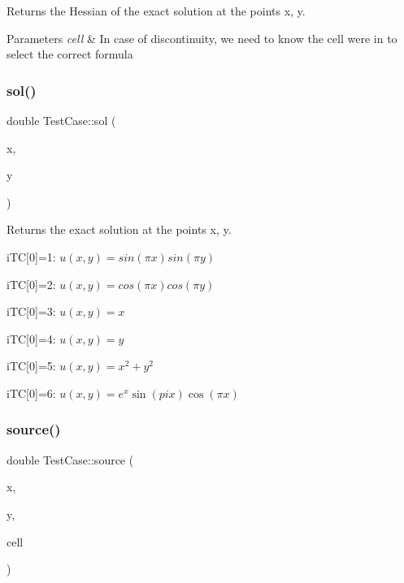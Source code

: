 Returns the Hessian of the exact solution at the points x, y. 


\begin{DoxyParams}{Parameters}
{\em cell} & In case of discontinuity, we need to know the cell we\textquotesingle{}re in to select the correct formula \\
\hline
\end{DoxyParams}
\mbox{\label{classTestCase_aede719dac81c460c713d930a379c537e}} 
\subsubsection{\texorpdfstring{sol()}{sol()}}
{\footnotesize\ttfamily double Test\+Case\+::sol (\begin{DoxyParamCaption}\item[{const double}]{x,  }\item[{const double}]{y }\end{DoxyParamCaption})}



Returns the exact solution at the points x, y. 

i\+TC\mbox{[}0\mbox{]}=1\+: $u(x,y)=sin(\pi x) sin(\pi y)$

i\+TC\mbox{[}0\mbox{]}=2\+: $u(x,y)=cos(\pi x) cos(\pi y)$

i\+TC\mbox{[}0\mbox{]}=3\+: $u(x,y)= x$

i\+TC\mbox{[}0\mbox{]}=4\+: $u(x,y)= y$

i\+TC\mbox{[}0\mbox{]}=5\+: $u(x,y)= x^2 + y^2$

i\+TC\mbox{[}0\mbox{]}=6\+: $u(x,y)= e^x \sin(pi x) \cos(\pi x)$ \mbox{\label{classTestCase_a5b2e54e9f17ac2ec9c1d675f97fbe335}} 
\subsubsection{\texorpdfstring{source()}{source()}}
{\footnotesize\ttfamily double Test\+Case\+::source (\begin{DoxyParamCaption}\item[{const double}]{x,  }\item[{const double}]{y,  }\item[{const \hyperlink{classHArDCore2D_1_1Cell}{Cell} $\ast$}]{cell }\end{DoxyParamCaption})}




